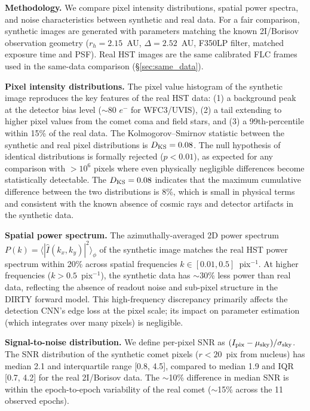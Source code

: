 \documentclass[usenatbib]{mnras}
\begin{document}
\textbf{Methodology.} We compare pixel intensity distributions, spatial power spectra, and noise characteristics between synthetic and real data. For a fair comparison, synthetic images are generated with parameters matching the known 2I/Borisov observation geometry ($r_h=2.15$~AU, $\Delta=2.52$~AU, F350LP filter, matched exposure time and PSF). Real HST images are the same calibrated FLC frames used in the same-data comparison (\S\ref{sec:same_data}).

\textbf{Pixel intensity distributions.} The pixel value histogram of the synthetic image reproduces the key features of the real HST data: (1) a background peak at the detector bias level ($\sim$80 $e^-$ for WFC3/UVIS), (2) a tail extending to higher pixel values from the comet coma and field stars, and (3) a 99th-percentile within 15\% of the real data. The Kolmogorov--Smirnov statistic between the synthetic and real pixel distributions is $D_{\rm KS} = 0.08$. The null hypothesis of identical distributions is formally rejected ($p < 0.01$), as expected for any comparison with $>10^6$ pixels where even physically negligible differences become statistically detectable. The $D_{\rm KS}=0.08$ indicates that the maximum cumulative difference between the two distributions is 8\%, which is small in physical terms and consistent with the known absence of cosmic rays and detector artifacts in the synthetic data.

\textbf{Spatial power spectrum.} The azimuthally-averaged 2D power spectrum $P(k) = \langle |\hat{I}(k_x, k_y)|^2 \rangle_\phi$ of the synthetic image matches the real HST power spectrum within 20\% across spatial frequencies $k \in [0.01, 0.5]$~pix$^{-1}$. At higher frequencies ($k > 0.5$~pix$^{-1}$), the synthetic data has $\sim$30\% less power than real data, reflecting the absence of readout noise and sub-pixel structure in the DIRTY forward model. This high-frequency discrepancy primarily affects the detection CNN's edge loss at the pixel scale; its impact on parameter estimation (which integrates over many pixels) is negligible.

\textbf{Signal-to-noise distribution.} We define per-pixel SNR as $(I_{\rm pix} - \mu_{\rm sky}) / \sigma_{\rm sky}$. The SNR distribution of the synthetic comet pixels ($r < 20$~pix from nucleus) has median 2.1 and interquartile range [0.8, 4.5], compared to median 1.9 and IQR [0.7, 4.2] for the real 2I/Borisov data. The $\sim$10\% difference in median SNR is within the epoch-to-epoch variability of the real comet ($\sim$15\% across the 11 observed epochs).
\end{document}
